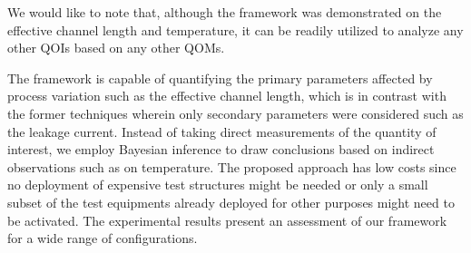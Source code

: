 We would like to note that, although the framework was demonstrated on the
effective channel length and temperature, it can be readily utilized to analyze
any other \acp{QOI} based on any other \acp{QOM}.

The framework is capable of quantifying the primary parameters affected by
process variation such as the effective channel length, which is in contrast
with the former techniques wherein only secondary parameters were considered
such as the leakage current. Instead of taking direct measurements of the
quantity of interest, we employ Bayesian inference to draw conclusions based on
indirect observations such as on temperature. The proposed approach has low
costs since no deployment of expensive test structures might be needed or only a
small subset of the test equipments already deployed for other purposes might
need to be activated. The experimental results present an assessment of our
framework for a wide range of configurations.
